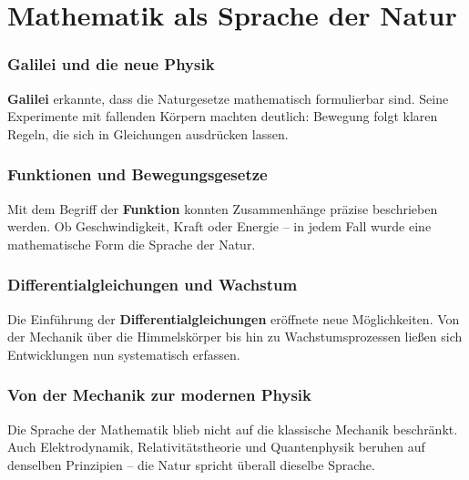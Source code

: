 \chapter{Mathematik als Sprache der Natur}
\label{chap:IV_sprache}
\label{chap:IV_algorithmen}
\setcounter{section}{4}
\setcounter{subsection}{0}
\setcounter{subsubsection}{1}
\setcounter{secnumdepth}{3}
\setlength{\parindent}{0pt}


\subsection{Galilei und die neue Physik}
\textbf{Galilei} erkannte, dass die Naturgesetze mathematisch formulierbar sind. 
Seine Experimente mit fallenden Körpern machten deutlich: Bewegung folgt klaren Regeln, die sich in Gleichungen ausdrücken lassen. 

\subsection{Funktionen und Bewegungsgesetze}
Mit dem Begriff der \textbf{Funktion} konnten Zusammenhänge präzise beschrieben werden. 
Ob Geschwindigkeit, Kraft oder Energie – in jedem Fall wurde eine mathematische Form die Sprache der Natur. 

\subsection{Differentialgleichungen und Wachstum}
Die Einführung der \textbf{Differentialgleichungen} eröffnete neue Möglichkeiten. 
Von der Mechanik über die Himmelskörper bis hin zu Wachstumsprozessen ließen sich Entwicklungen nun systematisch erfassen. 

\subsection{Von der Mechanik zur modernen Physik}
Die Sprache der Mathematik blieb nicht auf die klassische Mechanik beschränkt. 
Auch Elektrodynamik, Relativitätstheorie und Quantenphysik beruhen auf denselben Prinzipien – 
die Natur spricht überall dieselbe Sprache. 
